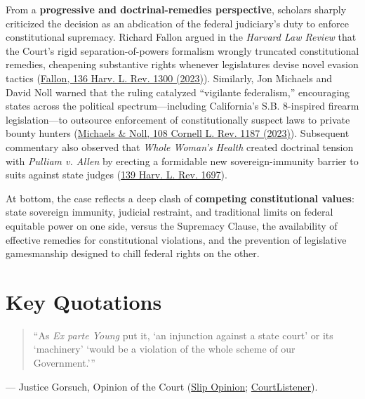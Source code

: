 \documentclass[12pt]{article}
\begin{document}
From a \textbf{progressive and doctrinal-remedies perspective}, scholars sharply criticized the decision as an abdication of the federal judiciary's duty to enforce constitutional supremacy. Richard Fallon argued in the \textit{Harvard Law Review} that the Court's rigid separation-of-powers formalism wrongly truncated constitutional remedies, cheapening substantive rights whenever legislatures devise novel evasion tactics (\href{https://harvardlawreview.org/print/vol-136/constitutional-remedies-in-one-era-and-out-the-other/}{Fallon, 136 Harv. L. Rev. 1300 (2023)}). Similarly, Jon Michaels and David Noll warned that the ruling catalyzed ``vigilante federalism,'' encouraging states across the political spectrum---including California's S.B. 8-inspired firearm legislation---to outsource enforcement of constitutionally suspect laws to private bounty hunters (\href{https://publications.lawschool.cornell.edu/lawreview/wp-content/uploads/sites/2/2023/09/Michaels-Noll-final.pdf}{Michaels \& Noll, 108 Cornell L. Rev. 1187 (2023)}). Subsequent commentary also observed that \textit{Whole Woman's Health} created doctrinal tension with \textit{Pulliam v. Allen} by erecting a formidable new sovereign-immunity barrier to suits against state judges (\href{https://harvardlawreview.org/wp-content/uploads/2026/05/139-Harv.-L.-Rev.-1697.pdf}{139 Harv. L. Rev. 1697}).

At bottom, the case reflects a deep clash of \textbf{competing constitutional values}: state sovereign immunity, judicial restraint, and traditional limits on federal equitable power on one side, versus the Supremacy Clause, the availability of effective remedies for constitutional violations, and the prevention of legislative gamesmanship designed to chill federal rights on the other.

\section{Key Quotations}

\begin{quote}
``As \textit{Ex parte Young} put it, `an injunction against a state court' or its `machinery' `would be a violation of the whole scheme of our Government.'''
\end{quote}
\noindent --- Justice Gorsuch, Opinion of the Court (\href{https://www.supremecourt.gov/opinions/21pdf/21-463_3ebh.pdf}{Slip Opinion}; \href{https://www.courtlistener.com/opinion/5305640/whole-womans-health-v-jackson/}{CourtListener}).
\end{document}
